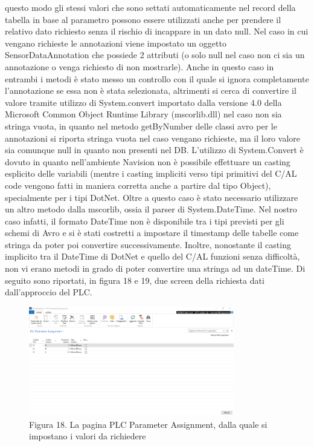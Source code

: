 questo modo gli stessi valori che sono settati automaticamente nel record della tabella in base al parametro possono essere utilizzati anche per prendere il relativo dato richiesto senza il rischio di incappare in un dato null. Nel caso in cui vengano richieste le annotazioni viene impostato un oggetto SensorDataAnnotation che possiede 2 attributi (o solo null nel caso non ci sia un annotazione o venga richiesto di non mostrarle). Anche in questo caso in entrambi i metodi è stato messo un controllo con il quale si ignora completamente l’annotazione se essa non è stata selezionata, altrimenti si cerca di convertire il valore tramite utilizzo di System.convert importato dalla versione 4.0 della Microsoft Common Object Runtime Library (mscorlib.dll) nel caso non sia stringa vuota, in quanto nel metodo getByNumber delle classi avro per le annotazioni si riporta stringa vuota nel caso vengano richieste, ma il loro valore sia comunque null in quanto non presenti nel DB. L’utilizzo di System.Convert è dovuto in quanto nell’ambiente Navision non è possibile effettuare un casting esplicito delle variabili (mentre i casting impliciti verso tipi primitivi del C/AL code vengono fatti in maniera corretta anche a partire dal tipo Object), specialmente per i tipi DotNet. Oltre a questo caso è stato necessario utilizzare un altro metodo dalla mscorlib, ossia il parser di System.DateTime. Nel nostro caso infatti, il formato DateTime non è disponibile tra i tipi previsti per gli schemi di Avro e si è stati costretti a impostare il timestamp delle tabelle come stringa da poter poi convertire successivamente. Inoltre, nonostante il casting implicito tra il DateTime di DotNet e quello del C/AL funzioni senza difficoltà, non vi erano metodi in grado di poter convertire una stringa ad un dateTime. Di seguito sono riportati, in figura 18 e 19, due screen della richiesta dati dall'approccio del PLC.
\clearpage
\begin{figure}[ht]
	\centering
	\includegraphics[width=0.8\textwidth]{PLC-Assigment-List.png}
	\caption*{Figura 18. La pagina PLC Parameter Assignment, dalla quale si impostano i valori da richiedere}
\end{figure}
